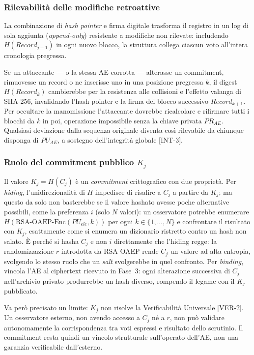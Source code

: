 \subsubsection{Rilevabilità delle modifiche retroattive}
La combinazione di \textit{hash pointer} e firma digitale trasforma il registro in un log di sola aggiunta (\textit{append-only}) resistente a modifiche non rilevate: includendo $H(Record_{j-1})$ in ogni nuovo blocco, la struttura collega ciascun voto all'intera cronologia pregressa.

Se un attaccante --- o la stessa AE corrotta --- alterasse un commitment, rimuovesse un record o ne inserisse uno in una posizione pregressa $k$, il digest $H(Record_k)$ cambierebbe per la resistenza alle collisioni e l'effetto valanga di SHA-256, invalidando l'hash pointer e la firma del blocco successivo $Record_{k+1}$. Per occultare la manomissione l'attaccante dovrebbe ricalcolare e rifirmare tutti i blocchi da $k$ in poi, operazione impossibile senza la chiave privata $PR_{AE}$. Qualsiasi deviazione dalla sequenza originale diventa così rilevabile da chiunque disponga di $PU_{AE}$, a sostegno dell'integrità globale [INT-3].

\subsubsection{Ruolo del commitment pubblico \texorpdfstring{$K_j$}{K\_j}}
\label{subsubsec:wp2_ruolo_kj}

Il valore $K_j = H(C_j)$ è un \textit{commitment} crittografico con due proprietà. Per \textit{hiding}, l'unidirezionalità di $H$ impedisce di risalire a $C_j$ a partire da $K_j$; ma questo da solo non basterebbe se il valore hashato avesse poche alternative possibili, come la preferenza $i$ (solo $N$ valori): un osservatore potrebbe enumerare $H(\text{RSA-OAEP-Enc}(PU_{ele}, k))$ per ogni $k \in \{1, \dots, N\}$ e confrontare il risultato con $K_j$, esattamente come si enumera un dizionario ristretto contro un hash non salato. È perché si hasha $C_j$ e non $i$ direttamente che l'hiding regge: la randomizzazione $r$ introdotta da RSA-OAEP rende $C_j$ un valore ad alta entropia, svolgendo lo stesso ruolo che un \textit{salt} svolgerebbe in quel confronto. Per \textit{binding}, vincola l'AE al ciphertext ricevuto in Fase~3: ogni alterazione successiva di $C_j$ nell'archivio privato produrrebbe un hash diverso, rompendo il legame con il $K_j$ pubblicato.

Va però precisato un limite: $K_j$ non risolve la Verificabilità Universale [VER-2]. Un osservatore esterno, non avendo accesso a $C_j$ né a $r$, non può validare autonomamente la corrispondenza tra voti espressi e risultato dello scrutinio. Il commitment resta quindi un vincolo strutturale sull'operato dell'AE, non una garanzia verificabile dall'esterno.

